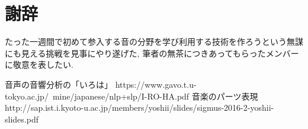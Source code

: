 \documentclass[uplatex,a4paper,11pt]{jsarticle}
\begin{document}
\section{謝辞}
たった一週間で初めて参入する音の分野を学び利用する技術を作ろうという無謀にも見える挑戦を見事にやり遂げた, 筆者の無茶につきあってもらったメンバーに敬意を表したい.

\begin{thebibliography}{}
   音声の音響分析の「いろは」 https://www.gavo.t.u-tokyo.ac.jp/~mine/japanese/nlp+slp/I-RO-HA.pdf
   音楽のパーツ表現 http://sap.ist.i.kyoto-u.ac.jp/members/yoshii/slides/sigmus-2016-2-yoshii-slides.pdf
\end{thebibliography}
\end{document}

